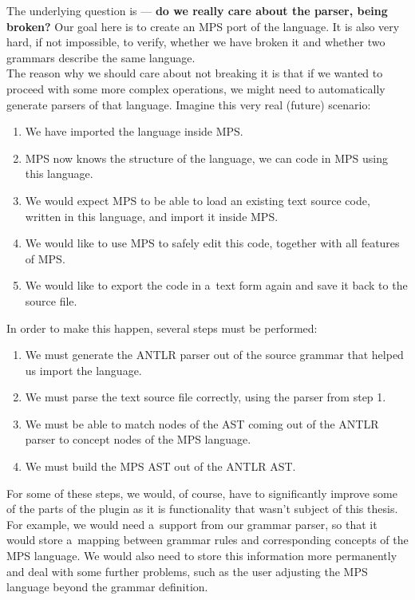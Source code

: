 The underlying question is --- \textbf{do we really care about the parser, being broken?}
Our goal here is to create an MPS port of the language.
It is also very hard, if not impossible, to verify, whether we have broken it and whether two grammars describe the same language.
\\

The reason why we should care about not breaking it is that if we wanted to proceed with some more complex operations, we might need to automatically generate parsers of that language.
Imagine this very real (future) scenario:

\begin{enumerate}
	\item We have imported the language inside MPS.

	\item MPS now knows the structure of the language, we can code in MPS using this language.

	\item We would expect MPS to be able to load an existing text source code, written in this language, and import it inside MPS.

	\item We would like to use MPS to safely edit this code, together with all features of MPS.

	\item We would like to export the code in a~text form again and save it back to the source file.
\end{enumerate}

\noindent
In order to make this happen, several steps must be performed:

\begin{enumerate}
	\item We must generate the ANTLR parser out of the source grammar that helped us import the language.

	\item We must parse the text source file correctly, using the parser from step 1.

	\item We must be able to match nodes of the AST coming out of the ANTLR parser to concept nodes of the MPS language.

	\item We must build the MPS AST out of the ANTLR AST.
\end{enumerate}

For some of these steps, we would, of course, have to significantly improve some of the parts of the plugin as it is functionality that wasn't subject of this thesis.
For example, we would need a~support from our grammar parser, so that it would store a~mapping between grammar rules and corresponding concepts of the MPS language.
We would also need to store this information more permanently and deal with some further problems, such as the user adjusting the MPS language beyond the grammar definition.
\\

